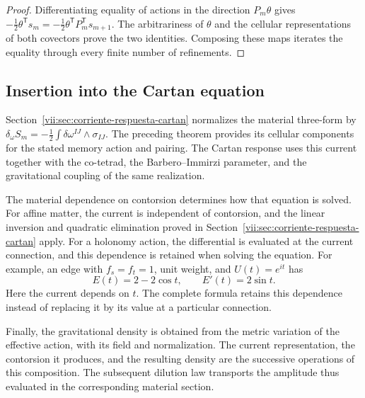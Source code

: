 \begin{proof}
Differentiating equality of actions in the direction
\(P_m\theta\) gives
\(-\tfrac12\theta^{\mathsf T}s_m
 =-\tfrac12\theta^{\mathsf T}P_m^{\mathsf T}s_{m+1}\).
The arbitrariness of \(\theta\) and the cellular representations
of both covectors prove the two identities. Composing
these maps iterates the equality through every finite number of refinements.
\end{proof}

\subsection{Insertion into the Cartan equation}

Section~\ref{vii:sec:corriente-respuesta-cartan} normalizes the material
three-form by
\(\delta_\omega S_m=-\tfrac12\int\delta\omega^{IJ}\wedge
\sigma_{IJ}\). The preceding theorem provides its cellular components
for the stated memory action and pairing.
The Cartan response uses this current together with the co-tetrad,
the Barbero--Immirzi parameter, and the gravitational coupling of
the same realization.

The material dependence on contorsion determines how that equation
is solved. For affine matter, the current is independent
of contorsion, and the linear inversion and quadratic elimination
proved in Section~\ref{vii:sec:corriente-respuesta-cartan} apply.
For a holonomy
action, the differential is evaluated at the current connection, and
this dependence is retained when solving the equation. For example, an edge with
\(f_s=f_t=1\), unit weight, and \(U(t)=e^{it}\) has
\[
 E(t)=2-2\cos t,\qquad E'(t)=2\sin t.
\]
Here the current depends on \(t\). The complete formula retains
this dependence instead of replacing it by its value at a particular
connection.

Finally, the gravitational density is obtained from the metric variation
of the effective action, with its field and normalization.
The current representation, the contorsion it produces, and the resulting
density are the successive operations of this composition.
The subsequent dilution law transports the amplitude thus evaluated in
the corresponding material section.
